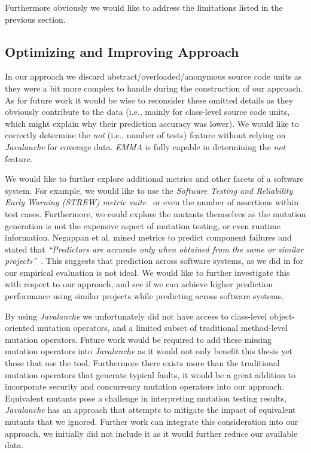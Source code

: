 Furthermore obviously we would like to address the limitations listed in the previous section.


\subsection{Optimizing and Improving Approach}
\label{subsec:conclusions_optimizing_approach}
In our approach we discard abstract/overloaded/anonymous source code units as they were a bit more complex to handle during the construction of our approach. As for future work it would be wise to reconsider these omitted details as they obviously contribute to the data (i.e., mainly for class-level source code units, which might explain why their prediction accuracy was lower). We would like to correctly determine the \emph{not} (i.e., number of tests) feature without relying on \emph{Javalanche} for coverage data. \emph{EMMA} is fully capable in determining the \emph{not} feature. 

We would like to further explore additional metrics and other facets of a software system. For example, we would like to use the \emph{Software Testing and Reliability Early Warning (STREW) metric suite}~\cite{NWO+05, NWVO05} or even the number of assertions within test cases. Furthermore, we could explore the mutants themselves as the mutation generation is not the expensive aspect of mutation testing, or even runtime information. Negappan et al. mined metrics to predict component failures and stated that \emph{``Predictors are accurate only when obtained from the same or similar projects''}~\cite{NBZ06}. This suggests that prediction across software systems, as we did in for our empirical evaluation is not ideal. We would like to further investigate this with respect to our approach, and see if we can achieve higher prediction performance using similar projects while predicting across software systems.

By using \emph{Javalanche} we unfortunately did not have access to class-level object-oriented mutation operators, and a limited subset of traditional method-level mutation operators. Future work would be required to add these missing mutation operators into \emph{Javalanche} as it would not only benefit this thesis yet those that use the tool. Furthermore there exists more than the traditional mutation operators that generate typical faults, it would be a great addition to incorporate security and concurrency mutation operators into our approach. Equivalent mutants pose a challenge in interpreting mutation testing results, \emph{Javalanche} has an approach that attempts to mitigate the impact of equivalent mutants that we ignored. Further work can integrate this consideration into our approach, we initially did not include it as it would further reduce our available data.

